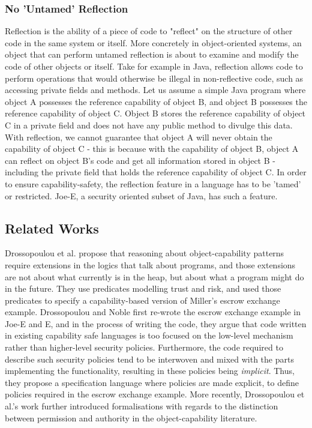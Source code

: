 \documentclass[a4paper,11pt,twoside]{article}
\begin{document}
\subsubsection{No 'Untamed' Reflection}
Reflection is the ability of a piece of code to "reflect" on the structure of other code in the same system or itself. More concretely in object-oriented systems, an object that can perform untamed reflection is about to examine and modify the code of other objects or itself. Take for example in Java, reflection allows code to perform operations that would otherwise be illegal in non-reflective code, such as accessing private fields and methods. Let us assume a simple Java program where object A possesses the reference capability of object B, and object B possesses the reference capability of object C. Object B stores the reference capability of object C in a private field and does not have any public method to divulge this data. With reflection, we cannot guarantee that object A will never obtain the capability of object C - this is because with the capability of object B, object A can reflect on object B's code and get all information stored in object B - including the private field that holds the reference capability of object C. In order to ensure capability-safety, the reflection feature in a language has to be 'tamed' or restricted. Joe-E\cite{mettler2010}, a security oriented subset of Java, has such a feature.
\subsection{Related Works}

Drossopoulou et al. \cite{drossopoulou2015b} 
propose that reasoning about object-capability patterns require extensions in the logics that talk about programs, and those extensions are not about what currently is in the heap, but about what a program might do in the future.
They use predicates modelling trust and risk, and used those predicates to specify a capability-based version of Miller's escrow exchange example\cite{miller2000}. Drossopoulou and Noble\cite{drossopoulou2013} first re-wrote the escrow exchange example in Joe-E and E, and in the process of writing the code, they argue that code written in existing capability safe languages is too focused on the low-level mechanism rather than higher-level security policies. Furthermore, the code required to describe such security policies tend to be interwoven and mixed with the parts implementing the functionality, resulting in these policies being \textit{implicit}. Thus, they propose  a specification language where policies are made explicit, to define policies required in the escrow exchange example\cite{drossopoulou2014, drossopoulou2015, drossopoulou2015b}. More recently, Drossopoulou et al.\cite{drossopoulou2016}'s work further introduced formalisations with regards to the distinction between permission and authority in the object-capability literature.\\
\end{document}

